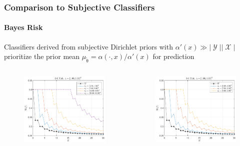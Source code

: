 \documentclass[aspectratio=169]{beamer}
\DeclareMathOperator{\Xcal}{\mathcal{X}}
\DeclareMathOperator{\Ycal}{\mathcal{Y}}
\begin{document}
\begin{frame}
\frametitle{Comparison to Subjective Classifiers}
\framesubtitle{Bayes Risk}

Classifiers derived from subjective Dirichlet priors with $\alpha'(x) \gg |\Ycal||\Xcal|$ prioritize the prior mean $\mu_{\tilde{\uptheta}} = \alpha(\cdot,x) / \alpha'(x)$ for prediction

\vspace{-0.5em}
\begin{columns}[T]

\begin{column}{.5\linewidth}

\begin{figure}
\centering
\includegraphics[width=0.8\linewidth]{Risk_01_Dir_N_leg_f_a0.pdf}
\label{fig:Risk_01_Dir_N_leg_f_a0}
\end{figure}
\vspace{-2.5em}
\centering
\footnotesize

\end{column}

\begin{column}{.5\linewidth}

\begin{figure}
\centering
\includegraphics[width=0.8\linewidth]{Risk_01_Dir_N_leg_f_mu.pdf}
\label{fig:Risk_01_Dir_N_leg_f_mu}
\end{figure}
\vspace{-2.5em}
\centering
\footnotesize


\end{column}
\end{columns}
\end{frame}
\end{document}
